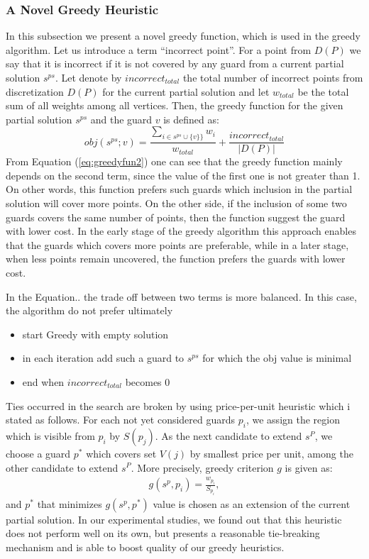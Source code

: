 \documentclass[runningheads,a4paper]{elsarticle}
\begin{document}
        \subsubsection{A Novel Greedy Heuristic}
        In this subsection we present a novel greedy function, which is used in the greedy algorithm. Let us introduce a term  ``incorrect point''. For a point from $D(P)$ we say that it is incorrect if it is not covered by any guard from a current partial solution $s^{ps}$. Let denote by $incorrect_{total}$ the total number of incorrect points from discretization $D(P)$ for the current partial solution and let $w_{total}$ be the total sum of all weights among all vertices. Then, the greedy function for the given partial solution $s^{ps}$ and the guard $v$ is defined as:
        \begin{equation}\label{eq:greedyfun2}
				obj(s^{ps}; v) = \frac{\sum_{i \in s^{ps} \cup \{v\}\}} w_i}{w_{total}}+ \frac{incorrect_{total}}{|D(P)|}
		\end{equation}	
            From Equation (\ref{eq:greedyfun2}) one can see that the greedy function mainly depends on the second term, since the value of the first one is not greater than 1. On other words, this function prefers such guards  which inclusion in the partial solution will cover more points. On the other side, if the inclusion of some two guards covers the same number of points, then the function suggest  the guard with lower cost. In the early stage of the greedy algorithm this approach enables that the guards which covers more points are preferable, while in a later stage, when less points remain uncovered, the function prefers the guards with lower cost.


            In the Equation.. the trade off between two terms is more balanced. In this case, the algorithm do not prefer ultimately 
            \begin{itemize}

\item start Greedy with empty solution
			\item in each iteration add such a guard to $s^{ps}$ for which the obj value is minimal
			\item end when $incorrect_{total}$ becomes 0
          \end{itemize}
      Ties occurred in the search are broken by using  price-per-unit heuristic which i stated as follows. 
       For each not yet considered guards $p_i$, we assign the region which is visible from $p_i$ by $S(p_j)$. As the next candidate to extend $s^P$, we choose a guard $p^*$ which covers set $V(j)$ by smallest price per unit, among the other candidate to extend $s^P$. More precisely, greedy criterion $g$ is given as:
      \begin{align}
      g(s^p, p_i) = \frac{w_{p_i}}{S_{p_i}},
      \end{align}
      and $p^*$ that minimizes $g(s^p, p^*)$ value is chosen as an extension of the current partial solution.
      In our experimental studies, we found out that this heuristic does not perform well on its own, but presents a reasonable tie-breaking mechanism and is able to boost quality of our greedy heuristics. 
\end{document}
